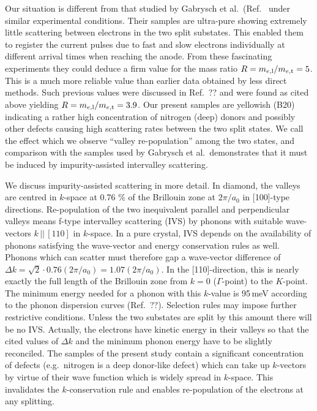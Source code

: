 Our situation is different from that studied by Gabrysch et al.\ (Ref.~\cite{isberg:172103,valley,gabrysch:063719} under similar experimental conditions. %
Their samples are ultra-pure showing extremely little scattering between electrons in the two split substates. 
This enabled them to register the current pulses due to fast and slow electrons individually at different arrival times when reaching the anode. 
From these fascinating experiments they could deduce a firm value for the mass ratio $R = m_{\mathnormal{e},\textrm{l}}/m_{\mathnormal{e},\textrm{t}} = 5$. 
This is a much more reliable value than earlier data obtained by less direct methods. 
Such previous values were discussed in Ref.\ ?? and were found as cited above yielding $R = m_{\mathnormal{e},\textrm{l}} /m_{\mathnormal{e},\textrm{t}} = 3.9$. 
Our present samples are yellowish {\color{red}(B20)}
 indicating a rather high concentration of nitrogen (deep) donors and possibly other defects causing high scattering rates between the two split states. 
We call the effect which we observe “valley re-population” among the two states,
 and comparison with the samples used by Gabrysch et al.\ demonstrates that it must be induced by impurity-assisted intervalley scattering.

We discuss impurity-assisted scattering in more detail. 
In diamond, the valleys are centred in $k$-space at 0.76 \% of the Brillouin zone at $2\pi/a_0$  in  [100]-type directions. 
Re-population of the two inequivalent parallel and perpendicular valleys means f-type intervalley scattering (IVS) by phonons with suitable wave-vectors $k\, ||\,  [110]$  in $k$-space. 
In a pure crystal, IVS depends on the availability of phonons satisfying the wave-vector and energy conservation rules as well.  
Phonons which can scatter must therefore gap a wave-vector difference of $\Delta k = \sqrt{2}\cdot 0.76 (2\pi/a_0) = 1.07 (2\pi/a_0)$. 
In the  [110]-direction, this is nearly exactly the full length of the Brillouin zone from $k = 0$ ($Γ$-point) to the $K$-point. 
The minimum energy needed for a phonon with this $k$-value is 95\,meV according to the phonon dispersion curves (Ref.\ ??). 
Selection rules may impose further restrictive conditions. 
Unless the two substates are split by this amount there will be no IVS.  
Actually, the electrons have kinetic energy in their valleys so that the cited values of $\Delta k$ and the minimum phonon energy have to be slightly reconciled. 
The samples of the present study contain a significant concentration of defects (e.g.\ nitrogen is a deep donor-like defect) which can take up $k$-vectors
 by virtue of their wave function which is widely spread in $k$-space. 
This invalidates the $k$-conservation rule and enables re-population of the electrons at any splitting.


